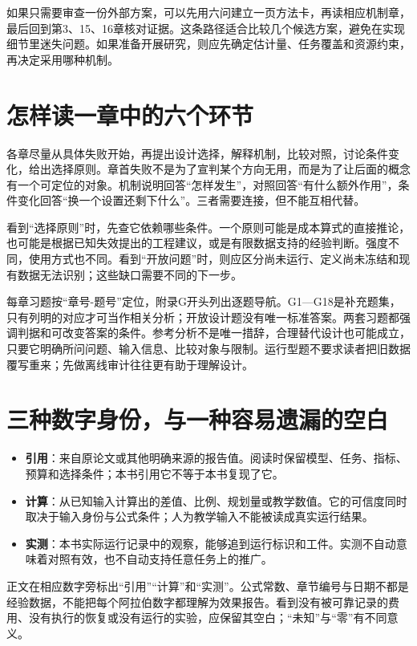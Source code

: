 如果只需要审查一份外部方案，可以先用六问建立一页方法卡，再读相应机制章，最后回到第3、15、16章核对证据。这条路径适合比较几个候选方案，避免在实现细节里迷失问题。如果准备开展研究，则应先确定估计量、任务覆盖和资源约束，再决定采用哪种机制。

\section*{怎样读一章中的六个环节}

各章尽量从具体失败开始，再提出设计选择，解释机制，比较对照，讨论条件变化，给出选择原则。章首失败不是为了宣判某个方向无用，而是为了让后面的概念有一个可定位的对象。机制说明回答“怎样发生”，对照回答“有什么额外作用”，条件变化回答“换一个设置还剩下什么”。三者需要连接，但不能互相代替。

看到“选择原则”时，先查它依赖哪些条件。一个原则可能是成本算式的直接推论，也可能是根据已知失效提出的工程建议，或是有限数据支持的经验判断。强度不同，使用方式也不同。看到“开放问题”时，则应区分尚未运行、定义尚未冻结和现有数据无法识别；这些缺口需要不同的下一步。

每章习题按“章号-题号”定位，附录G开头列出逐题导航。G1—G18是补充题集，只有列明的对应才可当作相关分析；开放设计题没有唯一标准答案。两套习题都强调判据和可改变答案的条件。参考分析不是唯一措辞，合理替代设计也可能成立，只要它明确所问问题、输入信息、比较对象与限制。运行型题不要求读者把旧数据覆写重来；先做离线审计往往更有助于理解设计。

\section*{三种数字身份，与一种容易遗漏的空白}

\begin{itemize}
 \item \textbf{引用}：来自原论文或其他明确来源的报告值。阅读时保留模型、任务、指标、预算和选择条件；本书引用它不等于本书复现了它。
 \item \textbf{计算}：从已知输入计算出的差值、比例、规划量或教学数值。它的可信度同时取决于输入身份与公式条件；人为教学输入不能被读成真实运行结果。
 \item \textbf{实测}：本书实际运行记录中的观察，能够追到运行标识和工件。实测不自动意味着对照有效，也不自动支持任意任务上的推广。
\end{itemize}

正文在相应数字旁标出“引用”“计算”和“实测”。公式常数、章节编号与日期不都是经验数据，不能把每个阿拉伯数字都理解为效果报告。看到没有被可靠记录的费用、没有执行的恢复或没有运行的实验，应保留其空白；“未知”与“零”有不同意义。

